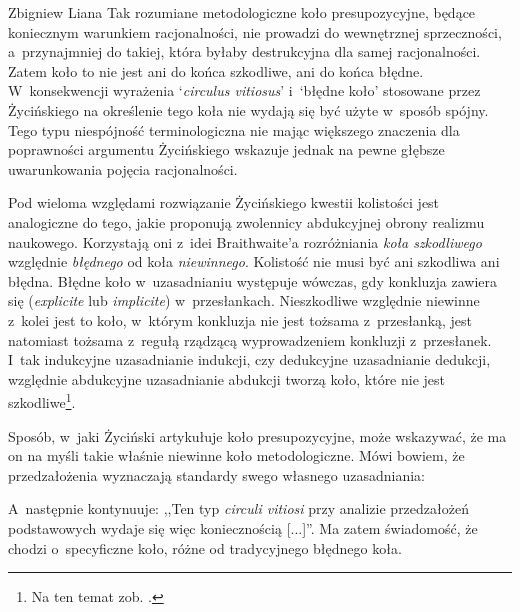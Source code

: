 \begin{artplenv}{Zbigniew Liana}
Tak rozumiane metodologiczne koło presupozycyjne, będące koniecznym warunkiem racjonalności, nie prowadzi do wewnętrznej sprzeczności, a~przynajmniej do takiej, która byłaby destrukcyjna dla samej racjonalności. Zatem koło to nie jest ani do końca szkodliwe, ani do końca błędne. W~konsekwencji wyrażenia ‘\textit{circulus vitiosus}' i~‘błędne koło' stosowane przez Życińskiego na określenie tego koła nie wydają się być użyte w~sposób spójny. Tego typu niespójność terminologiczna nie mając większego znaczenia dla poprawności argumentu Życińskiego wskazuje jednak na pewne głębsze uwarunkowania pojęcia racjonalności.

Pod wieloma względami rozwiązanie Życińskiego kwestii kolistości jest analogiczne do tego, jakie proponują zwolennicy abdukcyjnej obrony realizmu naukowego. Korzystają oni z~idei Braithwaite'a
\parencite*[][s.~274–278]{braithwaite_scientific_1953} %
 rozróżniania \textit{koła szkodliwego} względnie \textit{błędnego} od koła \textit{niewinnego}. Kolistość nie musi być ani szkodliwa ani błędna. Błędne koło w~uzasadnianiu występuje wówczas, gdy konkluzja zawiera się (\textit{explicite} lub \textit{implicite}) w~przesłankach. Nieszkodliwe względnie niewinne z~kolei jest to koło, w~którym konkluzja nie jest tożsama z~przesłanką, jest natomiast tożsama z~regułą rządzącą wyprowadzeniem konkluzji z~przesłanek. I~tak indukcyjne uzasadnianie indukcji, czy dedukcyjne uzasadnianie dedukcji, względnie abdukcyjne uzasadnianie abdukcji tworzą koło, które nie jest szkodliwe\footnote{Na ten temat zob. 
\parencites[][s.~138n]{liana_naturalistyczne_2003}[][s.~84]{psillos_scientific_1999}[][s.~102n.265n]{grobler_metodologia_2006}.%
}.

Sposób, w~jaki Życiński artykułuje koło presupozycyjne, może wskazywać, że ma on na myśli takie właśnie niewinne koło metodologiczne. Mówi bowiem, że przedzałożenia wyznaczają standardy swego własnego uzasadniania:


A~następnie kontynuuje: ,,Ten typ \textit{circuli vitiosi} przy analizie przedzałożeń podstawowych wydaje się więc koniecznością [...]''. Ma zatem świadomość, że chodzi o~specyficzne koło, różne od tradycyjnego błędnego koła.


\end{artplenv}
